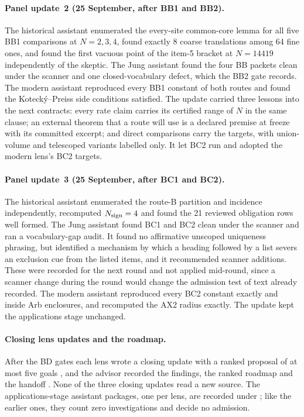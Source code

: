 \paragraph{Panel update~2 (25 September, after BB1 and BB2).} The historical
assistant enumerated the every-site common-core lemma for all five BB1
comparisons at $N=2,3,4$, found exactly 8 coarse translations among 64 fine
ones, and found the first vacuous point of the item-5 bracket at $N=14419$
independently of the skeptic. The Jung assistant found the four BB packets
clean under the scanner and one closed-vocabulary defect, which the BB2 gate
records. The modern assistant reproduced every BB1 constant of both routes
and found the Kotecký--Preiss side conditions satisfied. The update carried
three lessons into the next contracts: every rate claim carries its certified
range of $N$ in the same clause; an external theorem that a route will use is
a declared premise at freeze with its committed excerpt; and direct
comparisons carry the targets, with union-volume and telescoped variants
labelled only. It let BC2 run and adopted the modern lens's BC2 targets.

\paragraph{Panel update~3 (25 September, after BC1 and BC2).} The historical
assistant enumerated the route-B partition and incidence independently,
recomputed $N_{\rm sign}=4$ and found the 21 reviewed obligation rows well
formed. The Jung assistant found BC1 and BC2 clean under the scanner and ran a
vocabulary-gap audit. It found no affirmative unscoped uniqueness phrasing,
but identified a mechanism by which a heading followed by a list severs an
exclusion cue from the listed items, and it recommended scanner additions.
These were recorded for the next round and not applied mid-round, since a
scanner change during the round would change the admission test of text
already recorded. The modern assistant reproduced every BC2 constant exactly
and inside Arb enclosures, and recomputed the AX2 radius exactly. The update
kept the applications stage unchanged.

\paragraph{Closing lens updates and the roadmap.} After the BD gates each
lens wrote a closing update with a ranked proposal of at most five goals
\cite{r33lenses}, and the advisor recorded the findings, the ranked roadmap
and the handoff \cite{r33panel}. None of the three closing updates read a new
source. The applications-stage assistant packages, one per lens, are
recorded under ; like the earlier
ones, they count zero investigations and decide no admission.

